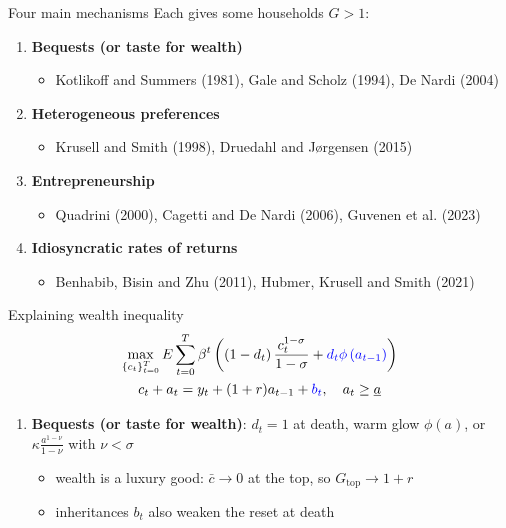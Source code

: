 \documentclass[10pt,english,10pt]{beamer}
\begin{document}
\begin{frame}{Four main mechanisms}
Each gives some households $G>1$:
\begin{enumerate}
\item \textbf{Bequests (or taste for wealth)}
\begin{itemize}
\item Kotlikoff and Summers (1981), Gale and Scholz (1994), De Nardi (2004)
\end{itemize}
\item \textbf{Heterogeneous preferences}
\begin{itemize}
\item Krusell and Smith (1998), Druedahl and Jørgensen (2015)
\end{itemize}
\item \textbf{Entrepreneurship}
\begin{itemize}
\item Quadrini (2000), Cagetti and De Nardi (2006), Guvenen et al. (2023)
\end{itemize}
\item \textbf{Idiosyncratic rates of returns}
\begin{itemize}
\item Benhabib, Bisin and Zhu (2011), Hubmer, Krusell and Smith (2021)
\end{itemize}
\end{enumerate}
\end{frame}

\begin{frame}{Explaining wealth inequality}
\[
\begin{gathered}\max_{\left\{ c_{t}\right\} _{t=0}^{T}}E\sum_{t=0}^{T}\beta^{t}\left(\left(1-d_{t}\right)\frac{c_{t}^{1-\sigma}}{1-\sigma}+\textcolor{blue}{d_{t}\phi\left(a_{t-1}\right)}\right)\\
c_{t}+a_{t}=y_{t}+(1+r)a_{t-1}+\textcolor{blue}{b_{t}},\quad a_{t}\geq\underline{a}
\end{gathered}
\]
\begin{enumerate}
\item \textbf{Bequests (or taste for wealth)}: $d_{t}=1$ at death, warm glow $\phi(a)$, or $\kappa\frac{a^{1-\nu}}{1-\nu}$ with $\nu<\sigma$
\begin{itemize}
\item wealth is a luxury good: $\bar{c}\to0$ at the top, so $G_{\text{top}}\to1+r$
\item inheritances $b_{t}$ also weaken the reset at death
\end{itemize}
\end{enumerate}
\end{frame}
\end{document}
